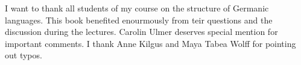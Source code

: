 \addchap{\lsAcknowledgementTitle} 



I want to thank all students of my course on the structure of Germanic languages. This book
benefited enourmously from teir questions and the discussion during the lectures. 
Carolin Ulmer %
deserves special mention for important comments. I thank Anne
Kilgus and Maya Tabea Wolff for pointing out typos.

